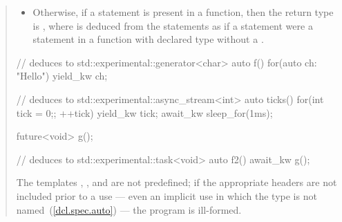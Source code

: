 \begin{quote}
\begin{itemize}
\item Otherwise, if a  statement is present in a function, then the return type is \linebreak
{},
where  is deduced from the  statements  as if a  statement were a  statement in a function with declared type  without a .

\end{itemize}
\enterexample
\begin{codeblock}
// deduces to std::experimental::generator<char>
auto f() { for(auto ch: "Hello") yield_kw ch; }

// deduces to std::experimental::async_stream<int>
auto ticks() {
  for(int tick = 0;; ++tick) {
    yield_kw tick;
    await_kw sleep_for(1ms);
  }
}

future<void> g();

// deduces to std::experimental::task<void>
auto f2() {  await_kw g(); }

\end{codeblock}
\exitexample

\pnum
The templates  , 
, and \linebreak
{} are not predefined;
if the appropriate headers are not included prior to a use --- even an implicit use in which the type is not
named~(\ref{dcl.spec.auto}) --- the program is ill-formed.
\end{quote}
